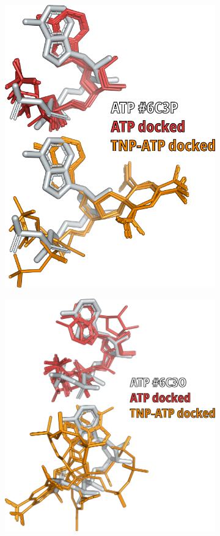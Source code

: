 \begin{figure}[h]
\begin{subfigure}[t]{0.28\textwidth}
		\includegraphics[width=\textwidth]{6c3p_docking.pdf}
	\end{subfigure}
	\hfill
	\begin{subfigure}[t]{0.34\textwidth}
		\caption{}\label{ch3fig:6c3o_docking}
		\centering
		\includegraphics[width=\textwidth]{6c3o_docking.pdf}

\end{subfigure}
\end{figure}
